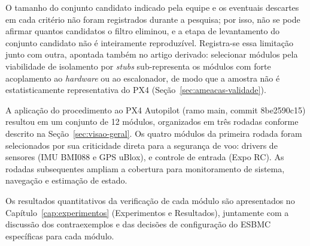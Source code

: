 O tamanho do conjunto candidato indicado pela equipe e os eventuais
descartes em cada critério não foram registrados durante a pesquisa; por isso,
não se pode afirmar quantos candidatos o filtro eliminou, e a etapa de
levantamento do conjunto candidato não é inteiramente reproduzível. Registra-se
essa limitação junto com outra, apontada também no artigo derivado: selecionar
módulos pela viabilidade de isolamento por \textit{stubs} sub-representa os
módulos com forte acoplamento ao \textit{hardware} ou ao escalonador, de modo
que a amostra não é estatisticamente representativa do PX4
(Seção~\ref{sec:ameacas-validade}).

A aplicação do procedimento ao PX4 Autopilot (ramo main, commit 8be2590c15) resultou em um conjunto de 12 módulos, organizados em três rodadas conforme descrito na Seção~\ref{sec:visao-geral}. Os quatro módulos da primeira rodada foram selecionados por sua criticidade direta para a segurança de voo: drivers de sensores (IMU BMI088 e GPS uBlox),  e controle de entrada (Expo RC). As rodadas subsequentes ampliam a cobertura para monitoramento de sistema, navegação e estimação de estado.

Os resultados quantitativos da verificação de cada módulo  são apresentados no Capítulo~\ref{cap:experimentos} (Experimentos e Resultados), juntamente com a discussão dos contraexemplos e das decisões de configuração do ESBMC específicas para cada módulo.

